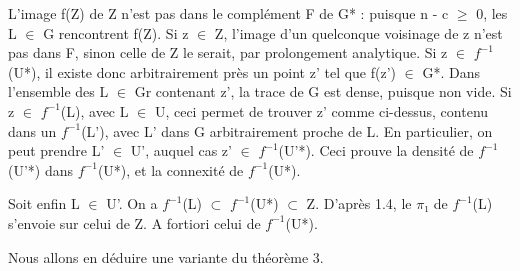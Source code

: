 \documentclass[10pt,a4paper]{article}
\begin{document}
\begin{adjustbox}{max totalsize={\textwidth}{0.945\textheight},center}
\begin{minipage}{\textwidth}
\noindent L'image f(Z) de Z n'est pas dans le complément F de G* : puisque n - c \ensuremath{≥} 0, les L \ensuremath{∈} G rencontrent f(Z). Si z \ensuremath{∈} Z, l'image d'un quelconque voisinage de z n'est pas dans F, sinon celle de Z le serait, par prolongement analytique. Si z \ensuremath{∈} \ensuremath{f^{-1}}(U*), il existe donc arbitrairement près un point z' tel que f(z') \ensuremath{∈} G*. Dans l'ensemble des L \ensuremath{∈} Gr contenant z', la trace de G est dense, puisque non vide. Si z \ensuremath{∈} \ensuremath{f^{-1}}(L), avec L \ensuremath{∈} U, ceci permet de trouver z' comme ci-dessus, contenu dans un \ensuremath{f^{-1}}(L'), avec L' dans G arbitrairement proche de L. En particulier, on peut prendre L' \ensuremath{∈} U', auquel cas z' \ensuremath{∈} \ensuremath{f^{-1}}(U'*). Ceci prouve la densité de \ensuremath{f^{-1}}(U'*) dans \ensuremath{f^{-1}}(U*), et la connexité de \ensuremath{f^{-1}}(U*).\par\smallskip
\noindent Soit enfin L \ensuremath{∈} U'. On a \ensuremath{f^{-1}}(L) \ensuremath{⊂} \ensuremath{f^{-1}}(U*) \ensuremath{⊂} Z. D'après 1.4, le \ensuremath{π₁} de \ensuremath{f^{-1}}(L) s'envoie sur celui de Z. A fortiori celui de \ensuremath{f^{-1}}(U*).\par\smallskip
\noindent Nous allons en déduire une variante du théorème 3.\par\smallskip
\end{minipage}
\end{adjustbox}
\newpage
\end{document}
